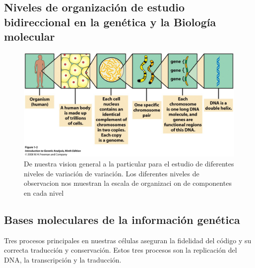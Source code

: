 \documentclass[10pt]{article}
\begin{document}
\subsection{Niveles de organización de estudio bidireccional en la genética y  la Biología molecular}
\begin{figure}[htb!]
\includegraphics[scale=0.3]{./figures/figure02.jpg}
\caption{De nuestra vision general a la particular para el estudio de diferentes niveles de variación de variación. Los diferentes niveles de observacion nos muestran la escala de organizaci
on de componentes en cada nivel }
\end{figure}


\subsection{ Bases moleculares de la información genética}

Tres procesos principales en nuestras células aseguran la fidelidad del código y su correcta traducción y conservación. Estos tres procesos son la replicación del DNA, la transcripción y la 
traducción. 
\end{document}

